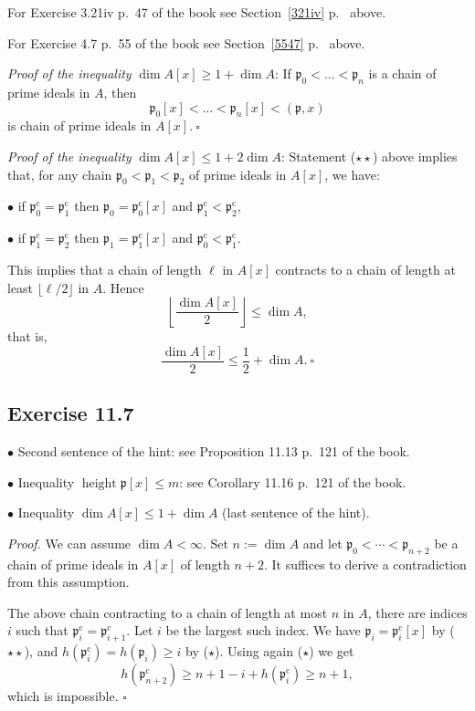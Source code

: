 \documentclass[parskip=half,fontsize=12pt]{scrartcl}%
\newcommand{\oo}{\operatorname}\newcommand{\ooo}{\operatorname*}
\newcommand{\mf}{\mathfrak}
\newcommand{\ppp}{\mf p}
\begin{document}
For Exercise 3.21iv p.~47 of the book see Section~\ref{321iv} p.~\pageref{321iv} above. 

For Exercise 4.7 p.~55 of the book see Section~\ref{5547} p.~\pageref{5547} above.

\emph{Proof of the inequality} $\dim A[x]\ge1+\dim A$: If 
$
\ppp_0<\dots<\ppp_n
$ 
is a chain of prime ideals in $A$, then 
$$
\ppp_0[x]<\dots<\ppp_n[x]<(\ppp,x)
$$ 
is chain of prime ideals in $A[x].\ \square$

\emph{Proof of the inequality} $\dim A[x]\le1+2\dim A$: Statement ($\star\star$) above implies that, for any chain $\ppp_0<\ppp_1<\ppp_2$ of prime ideals in $A[x]$, we have:

$\bullet$ if $\ppp_0^{\oo c}=\ppp_1^{\oo c}$ then $\ppp_0=\ppp_0^{\oo c}[x]$ and $\ppp_1^{\oo c}<\ppp_2^{\oo c}$,

$\bullet$ if $\ppp_1^{\oo c}=\ppp_2^{\oo c}$ then $\ppp_1=\ppp_1^{\oo c}[x]$ and $\ppp_0^{\oo c}<\ppp_1^{\oo c}$.

This implies that a chain of length $\ell$ in $A[x]$ contracts to a chain of length at least $\lfloor\ell/2\rfloor$ in $A$. Hence 
$$
\left\lfloor\frac{\dim A[x]}2\right\rfloor\le\dim A,
$$ 
that is,
$$
\frac{\dim A[x]}2\le\frac12+\dim A.\ \square
$$

\subsection{Exercise 11.7}%

$\bullet$ Second sentence of the hint: see Proposition 11.13 p.~121 of the book. 

$\bullet$ Inequality $\oo{height }\ppp[x]\le m$: see Corollary 11.16 p.~121 of the book.

$\bullet$ Inequality $\dim A[x]\le1+\dim A$ (last sentence of the hint). 



\emph{Proof.} We can assume $\dim A<\infty$. Set $n:=\dim A$ and let 
$ 
\ppp_0<\cdots<\ppp_{n+2}
$ 
be a chain of prime ideals in $A[x]$ of length $n+2$. It suffices to derive a contradiction from this assumption. 

The above chain contracting to a chain of length at most $n$ in $A$, there are indices $i$ such that $\ppp_i^{\oo c}=\ppp_{i+1}^{\oo c}$. Let $i$ be the largest such index. We have $\ppp_i=\ppp_i^{\oo c}[x]$ by ($\star\star$), and $h(\ppp_i^{\oo c})=h(\ppp_i)\ge i$ by ($\star$). Using again ($\star$) we get  
$$
h(\ppp_{n+2}^{\oo c})\ge n+1-i+h(\ppp_i^{\oo c})\ge n+1,
$$ 
which is impossible. $\square$
\end{document}
